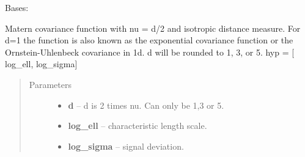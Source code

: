 \documentclass[letterpaper,10pt,english]{sphinxmanual}
\begin{document}
\begin{fulllineitems}
\label{pyGPs.Core:pyGPs.Core.cov.Matern}
Bases: 

Matern covariance function with nu = d/2 and isotropic distance measure. 
For d=1 the function is also known as the exponential covariance function 
or the Ornstein-Uhlenbeck covariance in 1d.
d will be rounded to 1, 3, or 5.
hyp = {[} log\_ell, log\_sigma{]}
\begin{quote}\begin{description}
\item[{Parameters}] \leavevmode\begin{itemize}
\item {} 
\textbf{d} -- d is 2 times nu. Can only be 1,3 or 5.

\item {} 
\textbf{log\_ell} -- characteristic length scale.

\item {} 
\textbf{log\_sigma} -- signal deviation.

\end{itemize}

\end{description}\end{quote}

\begin{fulllineitems}
\label{pyGPs.Core:pyGPs.Core.cov.Matern.dfunc}
\end{fulllineitems}


\begin{fulllineitems}
\label{pyGPs.Core:pyGPs.Core.cov.Matern.dmfunc}
\end{fulllineitems}


\begin{fulllineitems}
\label{pyGPs.Core:pyGPs.Core.cov.Matern.func}
\end{fulllineitems}



\end{fulllineitems}
\end{document}
